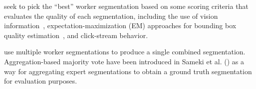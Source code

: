  seek to pick the ``best'' worker segmentation based on some scoring criteria that evaluates the quality of each segmentation, including the use of vision information~\cite{Vittayakorn2011,Russakovsky2015}, expectation-maximization (EM) approaches for bounding box quality estimation~\cite{MDWWelinder2010}, and click-stream behavior\cite{Cabezas2015,Sameki2015,Sorokin2008}.

 use multiple worker segmentations to produce a single combined segmentation. %
Aggregation-based majority vote have been introduced in Sameki et al. (\citeyear{Sameki2015}) as a way for aggregating expert segmentations to obtain a ground truth segmentation for evaluation purposes. 